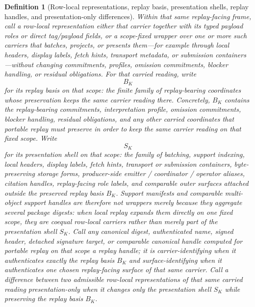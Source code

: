 \documentclass[11pt]{article}
\newtheorem{definition}{Definition}
\begin{document}
\begin{definition}[Row-local representations, replay basis, presentation shells, replay handles, and presentation-only differences]
Within that same replay-facing frame, call a \emph{row-local representation} either that carrier together with its typed payload roles or direct tag/payload fields, or a scope-fixed wrapper over one or more such carriers that batches, projects, or presents them---for example through local headers, display labels, fetch hints, transport metadata, or submission containers---without changing commitments, profiles, omission commitments, blocker handling, or residual obligations.
For that carried reading, write
\[
B_K
\]
for its \emph{replay basis} on that scope: the finite family of replay-bearing coordinates whose preservation keeps the same carrier reading there.
Concretely, $B_K$ contains the replay-bearing commitments, interpretation profile, omission commitments, blocker handling, residual obligations, and any other carried coordinates that portable replay must preserve in order to keep the same carrier reading on that fixed scope.
Write
\[
S_K
\]
for its \emph{presentation shell} on that scope: the family of batching, support indexing, local headers, display labels, fetch hints, transport or submission containers, byte-preserving storage forms, producer-side emitter / coordinator / operator aliases, citation handles, replay-facing role labels, and comparable outer surfaces attached outside the preserved replay basis $B_K$.
Support manifests and comparable multi-object support handles are therefore not wrappers merely because they aggregate several package digests: when local replay expands them directly on one fixed scope, they are coequal row-local carriers rather than merely part of the presentation shell $S_K$.
Call any canonical digest, authenticated name, signed header, detached signature target, or comparable canonical handle computed for portable replay on that scope a \emph{replay handle}; it is \emph{carrier-identifying} when it authenticates exactly the replay basis $B_K$ and \emph{surface-identifying} when it authenticates one chosen replay-facing surface of that same carrier.
Call a difference between two admissible row-local representations of that same carried reading \emph{presentation-only} when it changes only the presentation shell $S_K$ while preserving the replay basis $B_K$.
\end{definition}
\end{document}

